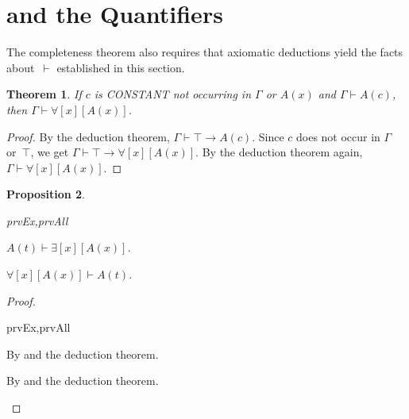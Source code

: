 \documentclass[10pt,a4paper]{article}
\makeatletter
\newcommand*{\olup}[1]{\MakeUppercase{#1}}
\theoremstyle{plain}
\newtheorem{thm}{Theorem}[section]
\newtheorem{prop}[thm]{Proposition}
\theoremstyle{definition}
\theoremstyle{remark}
\newenvironment{explain}{}{}
\newcommand*{\olfileid}[3]{}
\newcommand*{\olsection}[1]{\section*{#1}}
\newcommand*{\ollabel}[1]{\label{#1}}
\newcommand{\olref}{\@ifnextchar[{\olref@i}{\olref@final}}
\def\olref@i[#1]{\@ifnextchar[{\olref@ii}{\olref@final}}
\def\olref@ii[#1]{\@ifnextchar[{\olref@iii}{\olref@final}}
\def\olref@iii[#1]{\olref@final}
\def\olref@final#1{\ref{#1}}
\providecommand{\lif}{\mathbin{\rightarrow}}
\providecommand{\lforall}{\mathord{\forall}}
\providecommand{\lexists}{\mathord{\exists}}
\providecommand{\ltrue}{\top}
\providecommand{\Proves}{\mathrel{\vdash}}
\providecommand{\tagitem}[1]{\item[#1]}
\makeatother
\begin{document}




\olfileid{fol}{axd}{qpr}

\olsection{ and the Quantifiers}

\begin{explain}
  The completeness theorem also requires that axiomatic deductions
  yield the facts about~$\Proves$ established in this section.
\end{explain}

\begin{thm}
\ollabel{thm:strong-generalization} If $c$ is \olup{constant} not occurring
in $\Gamma$ or $A(x)$ and $\Gamma \Proves A(c)$, then $\Gamma
\Proves \lforall[x][A(x)]$.
\end{thm}

\begin{proof}
By the deduction theorem, $\Gamma \Proves \ltrue \lif A(c)$. Since
$c$ does not occur in $\Gamma$ or~$\top$, we get $\Gamma \Proves
\ltrue \lif \lforall[x][A(x)]$. By the deduction theorem again, $\Gamma \Proves
\lforall[x][A(x)]$.
\end{proof}

\begin{prop}
\ollabel{prop:provability-quantifiers}
\begin{tagenumerate}{prvEx,prvAll}
\tagitem{prvEx}{$A(t) \Proves \lexists[x][A(x)]$.}{}

\tagitem{prvAll}{$\lforall[x][A(x)] \Proves A(t)$.}{}
\end{tagenumerate}
\end{prop}

\begin{proof}
\begin{tagenumerate}{prvEx,prvAll}
\tagitem{prvEx}{By \olref[qua]{ax:q2} and the deduction theorem.}{}
\tagitem{prvAll}{By \olref[qua]{ax:q1} and the deduction theorem.}{}
\end{tagenumerate}
\end{proof}


\end{document}
